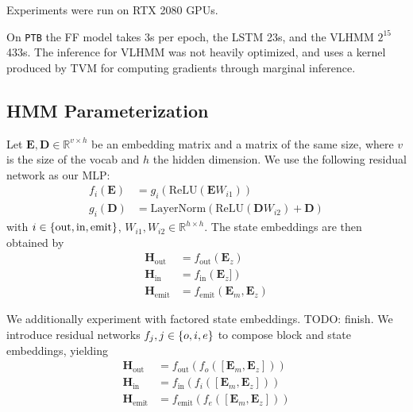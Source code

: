 \documentclass[11pt,a4paper]{article}
\begin{document}
Experiments were run on RTX 2080 GPUs.

On \texttt{PTB} the FF model takes 3s per epoch, the LSTM 23s,
and the VLHMM $2^{15}$ 433s.
The inference for VLHMM was not heavily optimized,
and uses a kernel produced by TVM \citep{tvm} for computing
gradients through marginal inference.

\subsection{HMM Parameterization}
Let $\mathbf{E},\mathbf{D}\in\mathbb{R}^{v \times h}$ be an
embedding matrix and a matrix of the same size,
where $v$ is the size of the vocab and $h$ the hidden dimension.
We use the following residual network as our MLP:
\begin{equation}
\label{eqn:res}
\begin{aligned}
f_i(\mathbf{E}) &= g_i(\textrm{ReLU}(\mathbf{E}W_{i1}))\\
g_i(\mathbf{D}) &= \textrm{LayerNorm}(\textrm{ReLU}(\mathbf{D}W_{i2}) + \mathbf{D})
\end{aligned}
\end{equation}
with $i \in \left\{\textrm{out},\textrm{in},\textrm{emit}\right\}$,
$W_{i1},W_{i2} \in \mathbb{R}^{h \times h}$.
The state embeddings are then obtained by
\begin{equation}
\begin{aligned}
\mathbf{H}_\textrm{out} &= f_\textrm{out}(\mathbf{E}_z)\\
\mathbf{H}_\textrm{in} &= f_\textrm{in}(\mathbf{E}_z])\\
\mathbf{H}_\textrm{emit} &= f_\textrm{emit}(\mathbf{E}_m,\mathbf{E}_z)
\end{aligned}
\end{equation}

We additionally experiment with factored state embeddings.
TODO: finish.
We introduce residual networks $f_j,j\in\left\{o,i,e\right\}$
to compose block and state embeddings, yielding
\begin{equation}
\begin{aligned}
\mathbf{H}_\textrm{out} &= f_\textrm{out}(f_o([\mathbf{E}_m,\mathbf{E}_z]))\\
\mathbf{H}_\textrm{in} &= f_\textrm{in}(f_i([\mathbf{E}_m,\mathbf{E}_z]))\\
\mathbf{H}_\textrm{emit} &= f_\textrm{emit}(f_e([\mathbf{E}_m,\mathbf{E}_z]))
\end{aligned}
\end{equation}
\end{document}

